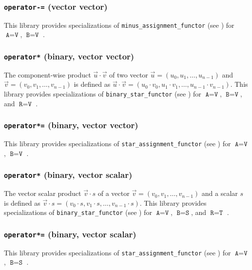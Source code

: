 \subsubsection{\texttt{operator-=} (vector vector)}
This library provides specializations of \texttt{minus\_assignment\_functor}  (see \cite{arithmeticfunctors})
for $\texttt{A} = \texttt{V}$, $\texttt{B} = \texttt{V}$ \ForAllVectors.

\subsubsection{\texttt{operator*} (binary, vector vector)}
The component-wise product $\vec{u} \cdot \vec{v}$ of two vector $\vec{u}=\left(u_0, u_1, \ldots, u_{n-1}\right)$
and $\vec{v}=\left(v_0,v_1,\ldots,v_{n-1}\right)$ is defined as $\vec{u} \cdot \vec{v} = \left(u_0 \cdot v_0,
u_1 \cdot v_1,\ldots, u_{n-1} \cdot v_{n-1}\right)$.
%
This library provides specializations of \texttt{binary\_star\_functor} (see \cite{arithmeticfunctors})
for $\texttt{A}=\texttt{V}$, $\texttt{B}=\texttt{V}$, and $\texttt{R} = \texttt{V}$ \ForAllVectors.

\subsubsection{\texttt{operator*=} (binary, vector vector)}
This library provides specializations of \texttt{star\_assignment\_functor}  (see \cite{arithmeticfunctors})
for $\texttt{A} = \texttt{V}$, $\texttt{B} = \texttt{V}$ \ForAllVectors.

\subsubsection{\texttt{operator*} (binary, vector scalar)}
The vector scalar product $\vec{v} \cdot s$ of a vector $\vec{v}=\left(v_0, v_1, \ldots, v_{n-1}\right)$
and a scalar $s$ is defined as $\vec{v} \cdot s = \left(v_0 \cdot s, v_1 \cdot s, \ldots, v_{n-1} \cdot
s\right)$.
%
This library provides specializations of \texttt{binary\_star\_functor} (see \cite{arithmeticfunctors})
for $\texttt{A}=\texttt{V}$, $\texttt{B}=\texttt{S}$, and $\texttt{R} = \texttt{T}$ \ForAllVectorsAndScalars.

\subsubsection{\texttt{operator*=} (binary, vector scalar)}
This library provides specializations of \texttt{star\_assignment\_functor}  (see \cite{arithmeticfunctors})
for $\texttt{A} = \texttt{V}$, $\texttt{B} = \texttt{S}$ \ForAllVectorsAndScalars.

